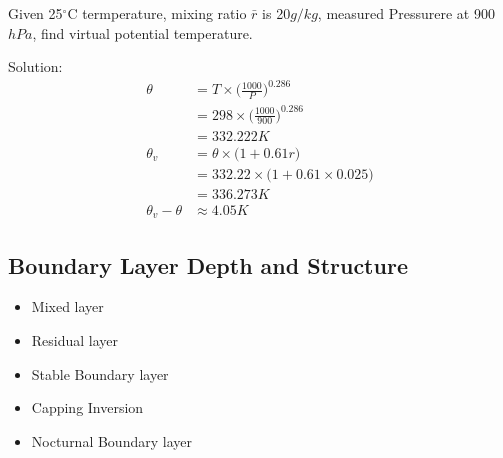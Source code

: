 \documentclass[fleqn,10pt]{SelfArx} %
\begin{document}
\begin{question}{}
	Given 25$^\circ$C termperature, mixing ratio $\bar{r}$ is 20$g/kg$, measured Pressurere at 900$hPa$, find virtual potential temperature.
\end{question}
\begin{answer}{}
	Solution:\begin{align*}
		\theta            & = T \times \Big(\frac{1000}{P}\Big)^{0.286}      \\
		                  & = 298 \times \Big(\frac{1000}{900}\Big)^{0.286}  \\
		                  & = 332.222 K                                      \\
		\theta_v          & = \theta \times \big(1 + 0.61r \big)             \\
		                  & = 332.22 \times \big(1 + 0.61 \times 0.025 \big) \\
		                  & = 336.273 K                                      \\
		\theta_v - \theta & \approx 4.05 K
	\end{align*}
\end{answer}

\subsection{Boundary Layer Depth and Structure}
\begin{itemize}[noitemsep]
	\item Mixed layer
	\item Residual layer
	\item Stable Boundary layer
	\item Capping Inversion
	\item Nocturnal Boundary layer
\end{itemize}
\end{document}

